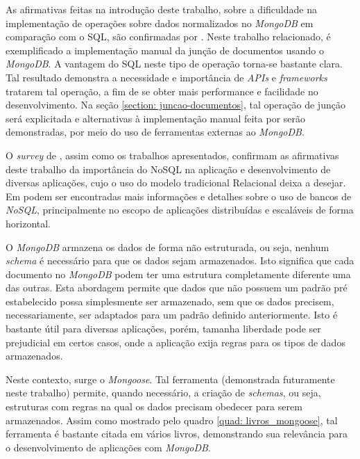 As afirmativas feitas na introdução deste trabalho, sobre a dificuldade na implementação de operações sobre dados normalizados no \textit{MongoDB} em comparação com o SQL, são confirmadas por . Neste trabalho relacionado, é exemplificado a implementação manual da junção de documentos usando o \textit{MongoDB}. A vantagem do SQL neste tipo de operação torna-se bastante clara. Tal resultado demonstra a necessidade e importância de \textit{APIs} e \textit{frameworks} tratarem tal operação, a fim de se obter mais performance e facilidade no desenvolvimento. Na seção \ref{section: juncao-documentos}, tal operação de junção será explicitada e alternativas à implementação manual feita por  serão demonstradas, por meio do uso de ferramentas externas ao \textit{MongoDB}.

O \textit{survey} de , assim como os trabalhos apresentados, confirmam as afirmativas deste trabalho da importância do NoSQL na aplicação e desenvolvimento de diversas aplicações, cujo o uso do modelo tradicional Relacional deixa a desejar. Em  podem ser encontradas mais informações e detalhes sobre o uso de bancos de \textit{NoSQL}, principalmente no escopo de aplicações distribuídas e escaláveis de forma horizontal.

O \textit{MongoDB} armazena os dados de forma não estruturada, ou seja, nenhum \textit{schema} é necessário para que os dados sejam armazenados. Isto significa que cada documento no \textit{MongoDB} podem ter uma estrutura completamente diferente uma das outras. Esta abordagem permite que dados que não possuem um padrão pré estabelecido possa simplesmente ser armazenado, sem que os dados precisem, necessariamente, ser adaptados para um padrão definido anteriormente. Isto é bastante útil para diversas aplicações, porém, tamanha liberdade pode ser prejudicial em certos casos, onde a aplicação exija regras para os tipos de dados armazenados.

Neste contexto, surge o \textit{Mongoose}. Tal ferramenta (demonstrada futuramente neste trabalho) permite, quando necessário, a criação de \textit{schemas}, ou seja, estruturas com regras na qual os dados precisam obedecer para serem armazenados. Assim como mostrado pelo quadro \ref{quad: livros_mongoose}, tal ferramenta é bastante citada em vários livros, demonstrando sua relevância para o desenvolvimento de aplicações com \textit{MongoDB}.

